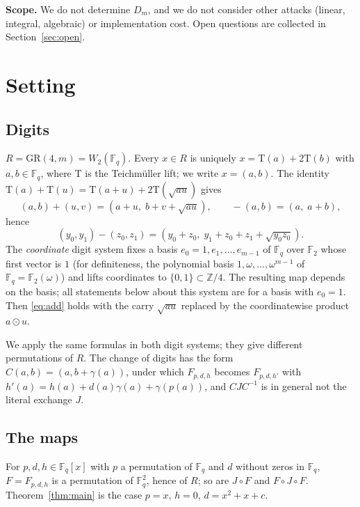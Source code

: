\documentclass[11pt]{amsart}
\theoremstyle{definition}
\newcommand{\F}{\mathbb{F}}
\newcommand{\Fq}{\mathbb{F}_q}
\newcommand{\GR}{\mathrm{GR}}
\newcommand{\T}{\mathrm{T}}
\begin{document}
\medskip
\noindent\textbf{Scope.} We do not determine $D_m$, and we do not consider other attacks (linear, integral, algebraic) or
implementation cost. Open questions are collected in Section~\ref{sec:open}.

\section{Setting}

\subsection{Digits}
$R=\GR(4,m)=W_2(\Fq)$. Every $x\in R$ is uniquely $x=\T(a)+2\T(b)$ with $a,b\in\Fq$, where $\T$ is the Teichm\"uller lift; we write
$x=(a,b)$. The identity $\T(a)+\T(u)=\T(a+u)+2\T(\sqrt{au})$ gives
\begin{equation}\label{eq:add}
(a,b)+(u,v)=(a+u,\;b+v+\sqrt{au}),\qquad -(a,b)=(a,\;a+b),
\end{equation}
hence
\begin{equation}\label{eq:sub}
(y_0,y_1)-(z_0,z_1)=(y_0+z_0,\;y_1+z_0+z_1+\sqrt{y_0z_0}).
\end{equation}
The \emph{coordinate} digit system fixes a basis $e_0=1,e_1,\dots,e_{m-1}$ of $\Fq$ over $\F_2$ whose first vector is $1$ (for
definiteness, the polynomial basis $1,\omega,\dots,\omega^{m-1}$ of $\Fq=\F_2(\omega)$) and lifts coordinates to $\{0,1\}\subset\mathbb Z/4$.
The resulting map depends on the basis; all statements below about this system are for a basis with $e_0=1$. Then
\eqref{eq:add} holds with the carry $\sqrt{au}$ replaced by the coordinatewise product $a\odot u$.

We apply the same formulas in both digit systems; they give different permutations of $R$. The change of digits has the form $C(a,b)=(a,b+\gamma(a))$, under which $F_{p,d,h}$ becomes
$F_{p,d,h'}$ with $h'(a)=h(a)+d(a)\gamma(a)+\gamma(p(a))$, and $CJC^{-1}$ is in general not the literal exchange $J$.

\subsection{The maps}\label{ss:maps}
For $p,d,h\in\Fq[x]$ with $p$ a permutation of $\Fq$ and $d$ without zeros in $\Fq$, $F=F_{p,d,h}$ is a permutation of $\Fq^2$, hence
of $R$; so are $J\circ F$ and $F\circ J\circ F$. Theorem~\ref{thm:main} is the case $p=x$, $h=0$, $d=x^2+x+c$.
\end{document}
